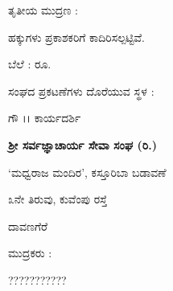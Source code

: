 \thispagestyle{empty}
{
\begin{center}

ತೃತೀಯ ಮುದ್ರಣ : 

\vfill

ಹಕ್ಕುಗಳು ಪ್ರಕಾಶಕರಿಗೆ ಕಾದಿರಿಸಲ್ಪಟ್ಟಿವೆ. 

\vfill

ಬೆಲೆ : ರೂ. 

\vfill

ಸಂಘದ ಪ್ರಕಟಣೆಗಳು ದೊರೆಯುವ ಸ್ಥಳ :

\medskip

ಗೌ ।। ಕಾರ್ಯದರ್ಶಿ

{\bf ಶ್ರೀ ಸರ್ವಜ್ಞಾಚಾರ್ಯ ಸೇವಾ ಸಂಘ (ರಿ.)}

`ಮಧ್ವರಾಜ ಮಂದಿರ', ಕಸ್ತೂರಿಬಾ ಬಡಾವಣೆ

೩ನೇ ತಿರುವು, ಕುವೆಂಪು ರಸ್ತೆ

ದಾವಣಗೆರೆ 

\vfill

ಮುದ್ರಕರು :

???????????

\end{center}

}
